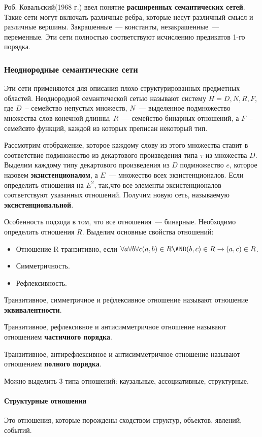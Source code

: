 Роб. Ковальский(1968 г.) ввел понятие \textbf{расширенных семантических сетей}. Такие сети могут включать различные ребра, которые несут различный смысл и различные вершины. Закрашенные~--- константы, незакрашенные~--- переменные. Эти сети полностью соответствуют исчислению предикатов 1-го порядка.

\subsubsection{Неоднородные семантические сети}
Эти сети применяются для описания плохо структурированных предметных областей. Неоднородной семантической сетью называют систему $H=D,N,R,F$, где $D$~-- семейство непустых множеств, $N$~--- выделенное подмножество множества слов конечной длинны, $R$~--- семейство бинарных отношений, а $F$~-- семейсвто функций, каждой из которых преписан некоторый тип.

Рассмотрим отображение, которое каждому слову из этого множества ставит в соответствие подмножество из декартового произведения типа $\tau$ из множества $D$. Выделим каждому типу декартового произведения из $D$ подмножество $e$, которое назовем \textbf{экзистенционалом}, а $E$~--- множество всех экзистенционалов. Если определить отношения на $E^2$, так,что все элементы эксистенционалов соответствуют указанных отношений. Получим новую сеть, называемую \textbf{эксистенциональной}.

Особенность подхода в том, что все отношения~--- бинарные. Необходимо определить отношения $R$. Выделим основные свойства отношений:
\begin{itemize}
	\item Отношение R транзитивно, если $\forall{}a\forall{}b\forall{}c(a,b)\in{}R\AND(b,c)\in{}R\rightarrow(a,c)\in{}R$.
	\item Симметричность.
	\item Рефлексивность.
\end{itemize}
Транзитивное, симметричное и рефлексивное отношение называют отношение \textbf{эквивалентности}.

Транзитивное, рефлексивное и антисимметричное отношение называют отношением \textbf{частичного порядка}.

Транзитивное, антирефлексивное и антисимметричное отношение называют отношением \textbf{полного порядка}.

Можно выделить 3 типа отношений: каузальные, ассоциативные, структурные.

\paragraph{Структурные отношения}
Это отношения, которые порождены сходством структур, объектов, явлений, событий. 
